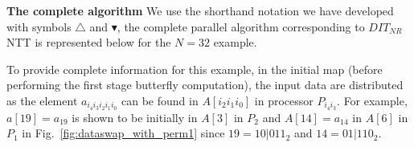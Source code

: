 \documentclass{iacrtrans}
\theoremstyle{plain}
\begin{document}
\textbf{The complete algorithm} We use the shorthand notation we have developed with symbols $\triangle$ and $\blacktriangledown$, the complete parallel algorithm corresponding to $DIT_{NR}$ NTT is represented below for the $N=32$ example.
\begin{table}[h!]\begin{center}
\end{center}\end{table}

To provide complete information for this example,  in the initial map (before performing the first stage butterfly computation), the input data are distributed as the element $a_{i_4i_3i_2i_1i_0}$ can be found in $A[i_2i_1i_0]$ in processor $P_{i_4i_3}$. For example, $a[19]=a_{19}$ is shown to be initially in $A[3]$ in $P_2$ and $A[14]=a_{14}$ in $A[6]$ in $P_1$ in Fig.~\ref{fig:dataswap_with_perm1} since $19=10|011_2$ and $14=01|110_2$. 
\end{document}
